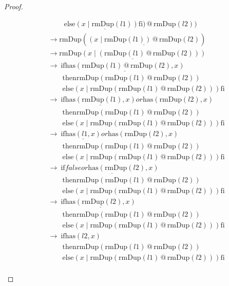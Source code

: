 \documentclass[12pt, a4paper]{article}
\newcommand{\rel}[1]{\mathrel{#1}}
\newcommand{\rmx}[1]{\mathrm{#1}}
\newcommand{\larrow}{\longrightarrow}
\newcommand{\under}{\underline}
\begin{document}
\begin{proof}
\begin{description}
\begin{align*}
	&\quad \quad\ \under{\rel{\rmx{else}} (x \mid \rmx{rmDup}(l1)) \rel{\rmx{fi}})} \rel{@} \rmx{rmDup}(l2)) \tag{by case splitting} \\
	&\larrow \rmx{rmDup}(\under{(x \mid \rmx{rmDup}(l1)) \rel{@} \rmx{rmDup}(l2)}) \tag{by if2} \\
	&\larrow \under{\rmx{rmDup}(x \mid (\rmx{rmDup}(l1) \rel{@} \rmx{rmDup}(l2)))} \tag{by @2} \\
	&\larrow\ \rel{\rmx{if}} \under{\rmx{has}(\rmx{rmDup}(l1) \rel{@} \rmx{rmDup}(l2), x)}  \\
	&\quad \quad \rel{\rmx{then}} \rmx{rmDup}(\rmx{rmDup}(l1) \rel{@} \rmx{rmDup}(l2)) \\
	&\quad \quad \rel{\rmx{else}} (x \mid \rmx{rmDup}(\rmx{rmDup}(l1) \rel{@} \rmx{rmDup}(l2))) \rel{\rmx{fi}} \tag{by rmDup2} \\
	&\larrow\ \rel{\rmx{if}} \under{\rmx{has}(\rmx{rmDup}(l1), x)} \rel{or} \rmx{has}(\rmx{rmDup}(l2), x)  \\
	&\quad \quad \rel{\rmx{then}} \rmx{rmDup}(\rmx{rmDup}(l1) \rel{@} \rmx{rmDup}(l2)) \\
	&\quad \quad \rel{\rmx{else}} (x \mid \rmx{rmDup}(\rmx{rmDup}(l1) \rel{@} \rmx{rmDup}(l2))) \rel{\rmx{fi}} \tag{by Problem 6 - Lemma 1} \\
	&\larrow\ \rel{\rmx{if}} \under{\rmx{has}(l1, x)} \rel{or} \rmx{has}(\rmx{rmDup}(l2), x)  \\
	&\quad \quad \rel{\rmx{then}} \rmx{rmDup}(\rmx{rmDup}(l1) \rel{@} \rmx{rmDup}(l2)) \\
	&\quad \quad \rel{\rmx{else}} (x \mid \rmx{rmDup}(\rmx{rmDup}(l1) \rel{@} \rmx{rmDup}(l2))) \rel{\rmx{fi}} \tag{by Problem 17 - Lemma 1} \\
	&\larrow\ \rel{\rmx{if}} \under{false \rel{or} \rmx{has}(\rmx{rmDup}(l2), x)}  \\
	&\quad \quad \rel{\rmx{then}} \rmx{rmDup}(\rmx{rmDup}(l1) \rel{@} \rmx{rmDup}(l2)) \\
	&\quad \quad \rel{\rmx{else}} (x \mid \rmx{rmDup}(\rmx{rmDup}(l1) \rel{@} \rmx{rmDup}(l2))) \rel{\rmx{fi}} \tag{by case splitting} \\
	&\larrow\ \rel{\rmx{if}} \under{\rmx{has}(\rmx{rmDup}(l2), x)}  \\
	&\quad \quad \rel{\rmx{then}} \rmx{rmDup}(\rmx{rmDup}(l1) \rel{@} \rmx{rmDup}(l2)) \\
	&\quad \quad \rel{\rmx{else}} (x \mid \rmx{rmDup}(\rmx{rmDup}(l1) \rel{@} \rmx{rmDup}(l2))) \rel{\rmx{fi}} \tag{by or} \\
	&\larrow\ \rel{\rmx{if}} \rmx{has}(l2, x)  \\
	&\quad \quad \rel{\rmx{then}} \rmx{rmDup}(\rmx{rmDup}(l1) \rel{@} \rmx{rmDup}(l2)) \\
	&\quad \quad \rel{\rmx{else}} (x \mid \rmx{rmDup}(\rmx{rmDup}(l1) \rel{@} \rmx{rmDup}(l2))) \rel{\rmx{fi}} \tag{by Problem 17 - Lemma 1} \\
\end{align*}
\end{description}
\end{proof}
\end{document}
